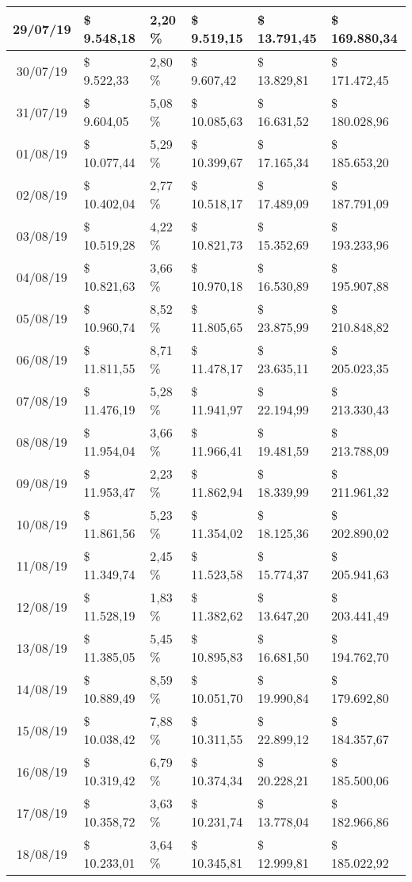 \begin{small}
\begin{longtable}{|c|l|l|l|l|l|}
29/07/19 & \$ 9.548,18 & 2,20 \% & \$ 9.519,15 & \$ 13.791,45 & \$ 169.880,34 \\ \hline
30/07/19 & \$ 9.522,33 & 2,80 \% & \$ 9.607,42 & \$ 13.829,81 & \$ 171.472,45 \\ \hline
31/07/19 & \$ 9.604,05 & 5,08 \% & \$ 10.085,63 & \$ 16.631,52 & \$ 180.028,96 \\ \hline
01/08/19 & \$ 10.077,44 & 5,29 \% & \$ 10.399,67 & \$ 17.165,34 & \$ 185.653,20 \\ \hline
02/08/19 & \$ 10.402,04 & 2,77 \% & \$ 10.518,17 & \$ 17.489,09 & \$ 187.791,09 \\ \hline
03/08/19 & \$ 10.519,28 & 4,22 \% & \$ 10.821,73 & \$ 15.352,69 & \$ 193.233,96 \\ \hline
04/08/19 & \$ 10.821,63 & 3,66 \% & \$ 10.970,18 & \$ 16.530,89 & \$ 195.907,88 \\ \hline
05/08/19 & \$ 10.960,74 & 8,52 \% & \$ 11.805,65 & \$ 23.875,99 & \$ 210.848,82 \\ \hline
06/08/19 & \$ 11.811,55 & 8,71 \% & \$ 11.478,17 & \$ 23.635,11 & \$ 205.023,35 \\ \hline
07/08/19 & \$ 11.476,19 & 5,28 \% & \$ 11.941,97 & \$ 22.194,99 & \$ 213.330,43 \\ \hline
08/08/19 & \$ 11.954,04 & 3,66 \% & \$ 11.966,41 & \$ 19.481,59 & \$ 213.788,09 \\ \hline
09/08/19 & \$ 11.953,47 & 2,23 \% & \$ 11.862,94 & \$ 18.339,99 & \$ 211.961,32 \\ \hline
10/08/19 & \$ 11.861,56 & 5,23 \% & \$ 11.354,02 & \$ 18.125,36 & \$ 202.890,02 \\ \hline
11/08/19 & \$ 11.349,74 & 2,45 \% & \$ 11.523,58 & \$ 15.774,37 & \$ 205.941,63 \\ \hline
12/08/19 & \$ 11.528,19 & 1,83 \% & \$ 11.382,62 & \$ 13.647,20 & \$ 203.441,49 \\ \hline
13/08/19 & \$ 11.385,05 & 5,45 \% & \$ 10.895,83 & \$ 16.681,50 & \$ 194.762,70 \\ \hline
14/08/19 & \$ 10.889,49 & 8,59 \% & \$ 10.051,70 & \$ 19.990,84 & \$ 179.692,80 \\ \hline
15/08/19 & \$ 10.038,42 & 7,88 \% & \$ 10.311,55 & \$ 22.899,12 & \$ 184.357,67 \\ \hline
16/08/19 & \$ 10.319,42 & 6,79 \% & \$ 10.374,34 & \$ 20.228,21 & \$ 185.500,06 \\ \hline
17/08/19 & \$ 10.358,72 & 3,63 \% & \$ 10.231,74 & \$ 13.778,04 & \$ 182.966,86 \\ \hline
18/08/19 & \$ 10.233,01 & 3,64 \% & \$ 10.345,81 & \$ 12.999,81 & \$ 185.022,92 \\ \hline

\end{longtable}
\end{small}
